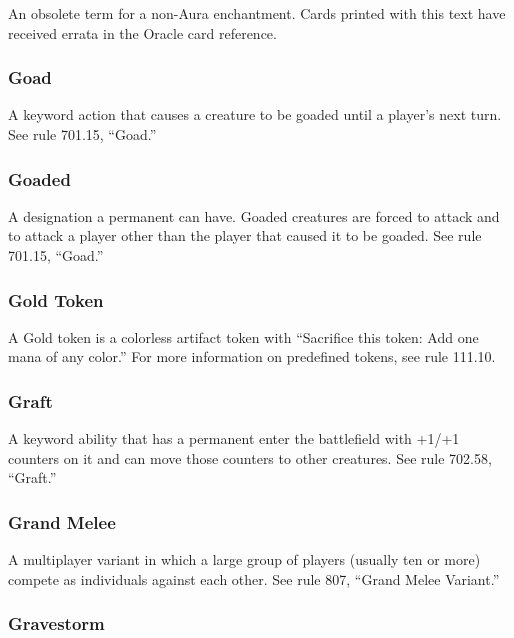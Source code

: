 {{{{{{{{{{{{{{{An obsolete term for a non-Aura enchantment. Cards printed with this text have received errata in the Oracle card reference.

\subsubsection*{Goad}

A keyword action that causes a creature to be goaded until a player’s next turn. See rule 701.15, “Goad.”

\subsubsection*{Goaded}

A designation a permanent can have. Goaded creatures are forced to attack and to attack a player other than the player that caused it to be goaded. See rule 701.15, “Goad.”

\subsubsection*{Gold Token}

A Gold token is a colorless artifact token with “Sacrifice this token: Add one mana of any color.” For more information on predefined tokens, see rule 111.10.

\subsubsection*{Graft}

A keyword ability that has a permanent enter the battlefield with +1/+1 counters on it and can move those counters to other creatures. See rule 702.58, “Graft.”

\subsubsection*{Grand Melee}

A multiplayer variant in which a large group of players (usually ten or more) compete as individuals against each other. See rule 807, “Grand Melee Variant.”

\subsubsection*{Gravestorm}

}}}}}}}}}}}}}}}
